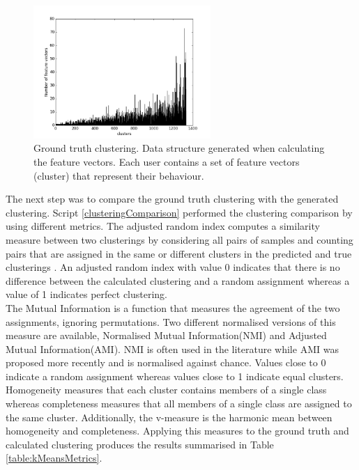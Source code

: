 \documentclass[11pt, oneside]{article}   	%
\begin{document}
\begin{figure}[h!]
  \centering
    \includegraphics[width=0.6\textwidth]{./pythonScripts/histGroundTruth.png}
      \caption{Ground truth clustering. Data structure generated when calculating the feature vectors. Each user contains a set of feature vectors (cluster) that represent their behaviour.}
      \label{figure:clusteringGroundTruth}
\end{figure}
\newpage
\noindent The next step was to compare the ground truth clustering with the generated clustering. Script \ref{clusteringComparison} performed the clustering comparison by using different metrics. The adjusted random index computes a similarity measure between two clusterings by considering all pairs of samples and counting pairs that are assigned in the same or different clusters in the predicted and true clusterings \cite{scikit}. An adjusted random index with value 0 indicates that there is no difference between the calculated clustering and a random assignment whereas a value of 1 indicates perfect clustering.\\
The Mutual Information is a function that measures the agreement of the two assignments, ignoring permutations. Two different normalised versions of this measure are available, Normalised Mutual Information(NMI) and Adjusted Mutual Information(AMI). NMI is often used in the literature while AMI was proposed more recently and is normalised against chance. Values close to 0 indicate a random assignment whereas values close to 1 indicate equal clusters.\\
Homogeneity measures that each cluster contains members of a single class whereas completeness measures that all members of a single class are assigned to the same cluster. Additionally, the v-measure is the harmonic mean between homogeneity and completeness. Applying this measures to the ground truth and calculated clustering produces the results summarised in Table \ref{table:kMeansMetrics}.
\newpage
\end{document}
